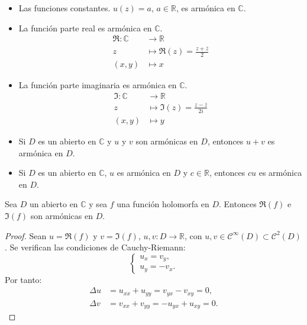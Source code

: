 \begin{example}
    \hfill
    \begin{itemize}
        \item Las funciones constantes.
              $u(z) = a$, $a \in \mathbb{R}$, es armónica en $\mathbb{C}$.
        \item La función parte real es armónica en $\mathbb{C}$.
              \begin{align*}
                  \Re: \mathbb{C} & \to \mathbb{R}                              \\
                  z               & \mapsto \Re(z) = \frac{z + \overline{z}}{2} \\
                  (x, y)          & \mapsto x
              \end{align*}
        \item La función parte imaginaria es armónica en $\mathbb{C}$.
              \begin{align*}
                  \Im: \mathbb{C} & \to \mathbb{R}                               \\
                  z               & \mapsto \Im(z) = \frac{z - \overline{z}}{2i} \\
                  (x, y)          & \mapsto y
              \end{align*}
        \item Si $D$ es un abierto en $\mathbb{C}$ y $u$ y $v$ son armónicas en $D$, entonces $u+v$ es armónica en $D$.
        \item Si $D$ es un abierto en $\mathbb{C}$, $u$ es armónica en $D$ y $c \in \mathbb{R}$, entonces $cu$ es armónica en $D$.
    \end{itemize}
\end{example}

\begin{theorem}
    Sea $D$ un abierto en $\mathbb{C}$ y sea $f$ una función holomorfa en $D$.
    Entonces $\Re(f)$ e $\Im(f)$ son armónicas en $D$.
\end{theorem}

\begin{proof}
    Sean $u = \Re(f)$ y $v = \Im(f)$, $u, v: D \to \mathbb{R}$, con $u, v \in \mathcal{C}^\infty(D) \subset \mathcal{C}^2(D)$.
    Se verifican las condiciones de Cauchy-Riemann:
    $$\begin{cases}
            u_x = v_y, \\
            u_y = -v_x.
        \end{cases}$$
    Por tanto:
    \begin{align*}
        \Delta u & = u_{xx} + u_{yy} = v_{yx} - v_{xy} = 0,  \\
        \Delta v & = v_{xx} + v_{yy} = -u_{yx} + u_{xy} = 0.
    \end{align*}
\end{proof}

